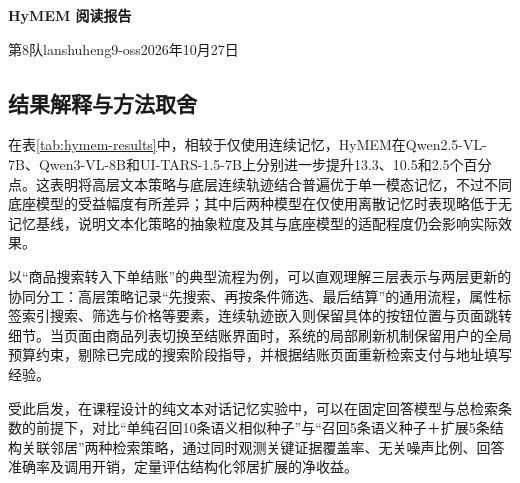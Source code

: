 \documentclass{jos}
\begin{document}
\raggedbottom
\begin{center}
{\Large\bfseries HyMEM 阅读报告}\par
第8队\quad lanshuheng9-oss\quad 2026年10月27日
\end{center}


\subsection{结果解释与方法取舍}

在表\ref{tab:hymem-results}中，相较于仅使用连续记忆，HyMEM在Qwen2.5-VL-7B、Qwen3-VL-8B和UI-TARS-1.5-7B上分别进一步提升13.3、10.5和2.5个百分点。这表明将高层文本策略与底层连续轨迹结合普遍优于单一模态记忆，不过不同底座模型的受益幅度有所差异；其中后两种模型在仅使用离散记忆时表现略低于无记忆基线，说明文本化策略的抽象粒度及其与底座模型的适配程度仍会影响实际效果。

以“商品搜索转入下单结账”的典型流程为例，可以直观理解三层表示与两层更新的协同分工：高层策略记录“先搜索、再按条件筛选、最后结算”的通用流程，属性标签索引搜索、筛选与价格等要素，连续轨迹嵌入则保留具体的按钮位置与页面跳转细节。当页面由商品列表切换至结账界面时，系统的局部刷新机制保留用户的全局预算约束，剔除已完成的搜索阶段指导，并根据结账页面重新检索支付与地址填写经验。

受此启发，在课程设计的纯文本对话记忆实验中，可以在固定回答模型与总检索条数的前提下，对比“单纯召回10条语义相似种子”与“召回5条语义种子＋扩展5条结构关联邻居”两种检索策略，通过同时观测关键证据覆盖率、无关噪声比例、回答准确率及调用开销，定量评估结构化邻居扩展的净收益。


\end{document}
